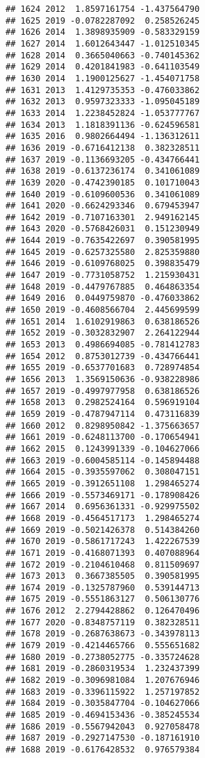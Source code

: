 \documentclass[
]{article}
\begin{document}
\begin{verbatim}
## 1624 2012  1.8597161754 -1.437564790
## 1625 2019 -0.0782287092  0.258526245
## 1626 2014  1.3898935909 -0.583329159
## 1627 2014  1.6012643447 -1.012510345
## 1628 2014  0.3665040663 -0.740145362
## 1629 2014  0.4201841983 -0.641103549
## 1630 2014  1.1900125627 -1.454071758
## 1631 2013  1.4129735353 -0.476033862
## 1632 2013  0.9597323333 -1.095045189
## 1633 2014  1.2238452824 -1.053777767
## 1634 2013  1.1818391136 -0.624596581
## 1635 2016  0.9802664494 -1.136312611
## 1636 2019 -0.6716412138  0.382328511
## 1637 2019 -0.1136693205 -0.434766441
## 1638 2019 -0.6137236174  0.341061089
## 1639 2020 -0.4742390185  0.101710043
## 1640 2019 -0.6109600536  0.341061089
## 1641 2020 -0.6624293346  0.679453947
## 1642 2019 -0.7107163301  2.949162145
## 1643 2020 -0.5768426031  0.151230949
## 1644 2019 -0.7635422697  0.390581995
## 1645 2019 -0.6257325580  2.825359880
## 1646 2019 -0.6109768025  0.398835479
## 1647 2019 -0.7731058752  1.215930431
## 1648 2019 -0.4479767885  0.464863354
## 1649 2016  0.0449759870 -0.476033862
## 1650 2019 -0.4608566704  2.445699599
## 1651 2014  1.6102919863  0.638186526
## 1652 2019 -0.3032832907  2.264122944
## 1653 2013  0.4986694085 -0.781412783
## 1654 2012  0.8753012739 -0.434766441
## 1655 2019 -0.6537701683  0.728974854
## 1656 2013  1.3569150636 -0.938228986
## 1657 2019 -0.4997977958  0.638186526
## 1658 2013  0.2982524164  0.596919104
## 1659 2019 -0.4787947114  0.473116839
## 1660 2012  0.8298950842 -1.375663657
## 1661 2019 -0.6248113700 -0.170654941
## 1662 2015  0.1243991339 -0.104627066
## 1663 2019 -0.6004585114 -0.145894488
## 1664 2015 -0.3935597062  0.308047151
## 1665 2019 -0.3912651108  1.298465274
## 1666 2019 -0.5573469171 -0.178908426
## 1667 2014  0.6956361331 -0.929975502
## 1668 2019 -0.4564517173  1.298465274
## 1669 2019 -0.5021426378  0.514384260
## 1670 2019 -0.5861717243  1.422267539
## 1671 2019 -0.4168071393  0.407088964
## 1672 2019 -0.2104610468  0.811509697
## 1673 2013  0.3667385505  0.390581995
## 1674 2019 -0.1325787960  0.539144713
## 1675 2019 -0.5551863127  0.506130776
## 1676 2012  2.2794428862  0.126470496
## 1677 2020 -0.8348757119  0.382328511
## 1678 2019 -0.2687638673 -0.343978113
## 1679 2019 -0.4214465766  0.555651682
## 1680 2019 -0.2738052775 -0.335724628
## 1681 2019 -0.2860319534  1.232437399
## 1682 2019 -0.3096981084  1.207676946
## 1683 2019 -0.3396115922  1.257197852
## 1684 2019 -0.3035847704 -0.104627066
## 1685 2019 -0.4694153436 -0.385245534
## 1686 2019 -0.5567942043  0.927058478
## 1687 2019 -0.2927147530 -0.187161910
## 1688 2019 -0.6176428532  0.976579384

\end{verbatim}
\end{document}
